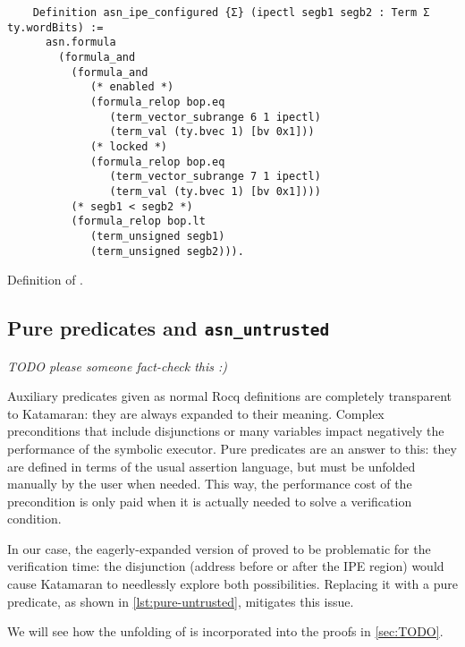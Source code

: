 \begin{listing}
  \begin{verbatim}
    Definition asn_ipe_configured {Σ} (ipectl segb1 segb2 : Term Σ ty.wordBits) :=
      asn.formula
        (formula_and
          (formula_and
             (* enabled *)
             (formula_relop bop.eq
                (term_vector_subrange 6 1 ipectl)
                (term_val (ty.bvec 1) [bv 0x1]))
             (* locked *)
             (formula_relop bop.eq
                (term_vector_subrange 7 1 ipectl)
                (term_val (ty.bvec 1) [bv 0x1])))
          (* segb1 < segb2 *)
          (formula_relop bop.lt
             (term_unsigned segb1)
             (term_unsigned segb2))).
  \end{verbatim}
  \caption{Definition of .}
  \label{lst:asn_ipe_configured}
\end{listing}

\subsection{Pure predicates and \texttt{asn\_untrusted}}

\emph{TODO please someone fact-check this :)}

Auxiliary predicates given as normal Rocq definitions are completely transparent to Katamaran: they are always expanded to their meaning. Complex preconditions that include disjunctions or many variables impact negatively the performance of the symbolic executor. Pure predicates are an answer to this: they are defined in terms of the usual assertion language, but must be unfolded manually by the user when needed. This way, the performance cost of the precondition is only paid when it is actually needed to solve a verification condition.

In our case, the eagerly-expanded version of  proved to be problematic for the verification time: the disjunction (address before or after the IPE region) would cause Katamaran to needlessly explore both possibilities. Replacing it with a pure predicate, as shown in \cref{lst:pure-untrusted}, mitigates this issue.

We will see how the unfolding of  is incorporated into the proofs in \cref{sec:TODO}.

